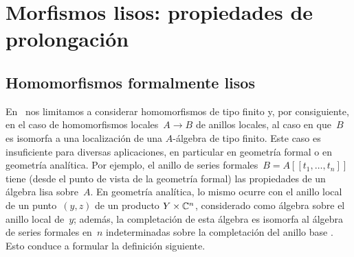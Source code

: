 
\chapter{Morfismos lisos: propiedades de prolongación}
\label{III}

\section{Homomorfismos formalmente lisos}
\label{III.1}

En~ nos limitamos a considerar homomorfismos de tipo finito y, por consiguiente, en el caso de homomorfismos locales~$A\to B$ de anillos locales, al caso en que~$B$ es isomorfa a una localización de una $A$-álgebra de tipo finito. Este caso es insuficiente para diversas aplicaciones, en particular en geometría formal o en geometría analítica. Por ejemplo, el anillo de series formales~$B=A[[t_1,\dots,t_n]]$ tiene (desde el punto de vista de la geometría formal) las propiedades de un álgebra lisa sobre~$A$. En geometría analítica, lo mismo ocurre con el anillo local de un punto~$(y,z)$ de un producto $Y\times\mathbb C^n$, considerado como álgebra sobre el anillo local de~$y$; además, la completación de esta álgebra es isomorfa al álgebra de series formales en~$n$ indeterminadas sobre la completación del anillo base
.
Esto conduce a formular la definición siguiente.

